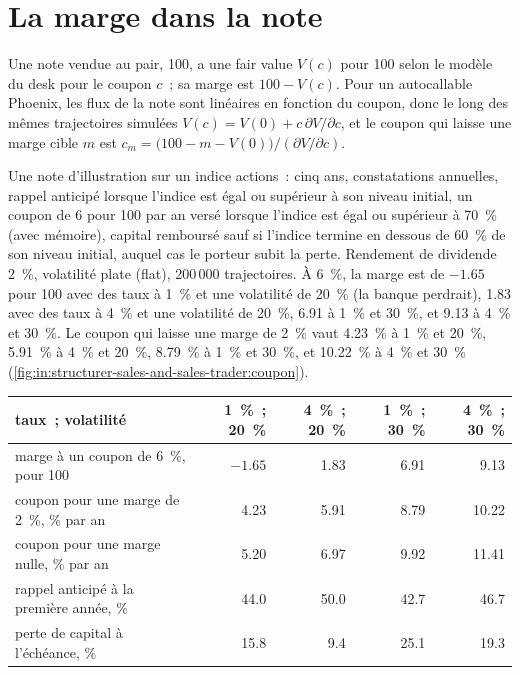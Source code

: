 \section{La marge dans la note}

\begin{method}\label{met:in:structurer-sales-and-sales-trader:margin}
Une note vendue au pair, 100, a une fair value $V(c)$ pour 100 selon le modèle du desk pour le coupon $c$~; sa marge est $100-V(c)$.
Pour un autocallable Phoenix, les flux de la note sont linéaires en fonction du coupon, donc le long des mêmes trajectoires simulées $V(c)=V(0)+c\,\partial V/\partial c$,
et le coupon qui laisse une marge cible $m$ est
$c_m=\bigl(100-m-V(0)\bigr)/(\partial V/\partial c)$.
\end{method}

\begin{example}\label{ex:in:structurer-sales-and-sales-trader:note}
Une note d'illustration sur un indice actions~: cinq ans, constatations annuelles, rappel anticipé lorsque l'indice est égal ou supérieur à son
niveau initial, un coupon de 6 pour 100 par an versé lorsque l'indice est égal ou supérieur à 70~\% (avec mémoire), capital remboursé sauf si
l'indice termine en dessous de 60~\% de son niveau initial, auquel cas le porteur subit la perte. Rendement de dividende 2~\%, volatilité plate (flat),
200\,000 trajectoires. À 6~\%, la marge est de $-1.65$ pour 100 avec des taux à 1~\% et une volatilité de 20~\% (la banque perdrait), 1.83
avec des taux à 4~\% et une volatilité de 20~\%, 6.91 à 1~\% et 30~\%, et 9.13 à 4~\% et 30~\%. Le coupon qui laisse une marge de 2~\%
vaut 4.23~\% à 1~\% et 20~\%, 5.91~\% à 4~\% et 20~\%, 8.79~\% à 1~\% et 30~\%, et 10.22~\% à 4~\% et 30~\%
(\cref{fig:in:structurer-sales-and-sales-trader:coupon}).
\end{example}

\begin{center}\footnotesize
\begin{tabular}{@{}lrrrr@{}}
\toprule
 taux~; volatilité & 1~\%~; 20~\% & 4~\%~; 20~\% & 1~\%~; 30~\% & 4~\%~; 30~\%\\
\midrule
marge à un coupon de 6~\%, pour 100 & $-1.65$ & 1.83 & 6.91 & 9.13\\
coupon pour une marge de 2~\%, \% par an & 4.23 & 5.91 & 8.79 & 10.22\\
coupon pour une marge nulle, \% par an & 5.20 & 6.97 & 9.92 & 11.41\\
rappel anticipé à la première année, \% & 44.0 & 50.0 & 42.7 & 46.7\\
perte de capital à l'échéance, \% & 15.8 & 9.4 & 25.1 & 19.3\\
\bottomrule
\end{tabular}
\end{center}

